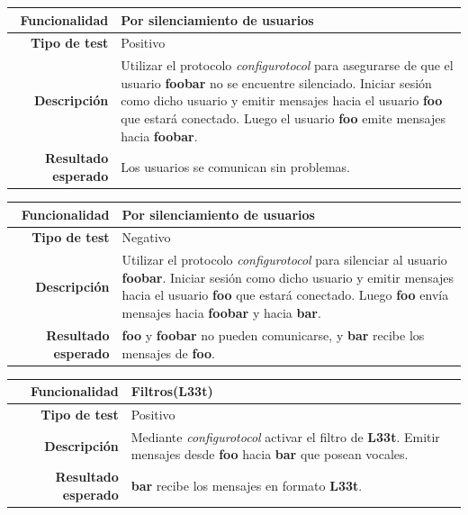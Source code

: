 \documentclass[a4paper,10pt]{article}
\begin{document}
\begin{center}
  \begin{tabular}{|r|p{12.5cm}|}
    \hline
    \textbf{Funcionalidad}	&	Por silenciamiento de usuarios\\
    \hline
    \textbf{Tipo de test}	&	Positivo\\
    \hline
    \textbf{Descripción}	&	Utilizar el protocolo \textit{configurotocol} para asegurarse de que el usuario
					\textbf{foobar} no se encuentre silenciado. Iniciar sesión como dicho
					usuario y emitir mensajes hacia el usuario \textbf{foo} que estará conectado.
					Luego el usuario \textbf{foo} emite mensajes hacia \textbf{foobar}.\\
    \hline
    \textbf{Resultado esperado}	&	Los usuarios se comunican sin problemas.\\
    \hline   
  \end{tabular}
\end{center}

\begin{center}
  \begin{tabular}{|r|p{12.5cm}|}
    \hline
    \textbf{Funcionalidad}	&	Por silenciamiento de usuarios\\
    \hline
    \textbf{Tipo de test}	&	Negativo\\
    \hline
    \textbf{Descripción}	&	Utilizar el protocolo \textit{configurotocol} para silenciar al usuario
					\textbf{foobar}. Iniciar sesión como dicho usuario y emitir mensajes hacia
					el usuario \textbf{foo} que estará conectado.
					Luego \textbf{foo} envía mensajes hacia \textbf{foobar} y hacia \textbf{bar}.\\
    \hline
    \textbf{Resultado esperado}	&	\textbf{foo} y \textbf{foobar} no pueden comunicarse, y \textbf{bar} recibe los mensajes de \textbf{foo}.\\
    \hline   
  \end{tabular}
\end{center}

\begin{center}
  \begin{tabular}{|r|p{12.5cm}|}
    \hline
    \textbf{Funcionalidad}	&	Filtros(L33t)\\
    \hline
    \textbf{Tipo de test}	&	Positivo\\
    \hline
    \textbf{Descripción}	&	Mediante \textit{configurotocol} activar el filtro de \textbf{L33t}. 
					Emitir mensajes desde \textbf{foo} hacia \textbf{bar} que posean vocales.\\
    \hline
    \textbf{Resultado esperado}	&	\textbf{bar} recibe los mensajes en formato \textbf{L33t}.\\
    \hline   
  \end{tabular}
\end{center}
\end{document}
